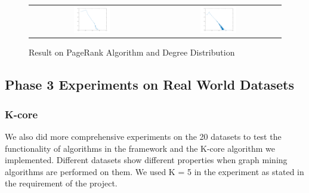 \begin{figure}[H]
\begin{center}
\begin{tabular}{cc}
     \includegraphics[width=0.3\textwidth]{FIG/10pagerank.png} &
     \includegraphics[width=0.3\textwidth]{FIG/10degreedist.png} \\
\end{tabular}
\caption{Result on PageRank Algorithm and Degree Distribution}
\end{center}
\end{figure}

\subsection{Phase 3 Experiments on Real World Datasets}

\subsubsection{K-core}
We also did more comprehensive experiments on the 20 datasets to test the functionality of algorithms in the framework and the K-core algorithm we implemented.
Different datasets show different properties when graph mining algorithms are performed on them. We used K = 5 in the experiment as stated in the requirement of the project.


